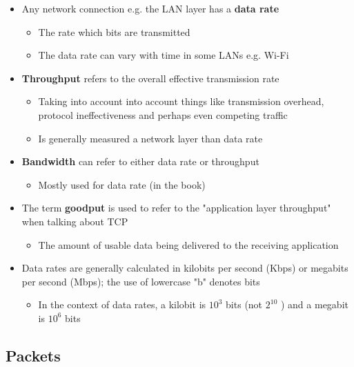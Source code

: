 \documentclass[11pt]{article}
\providecommand{\tightlist}{%
      \setlength{\itemsep}{0pt}\setlength{\parskip}{0pt}}
\begin{document}
\begin{itemize}
\tightlist
\item
  Any network connection e.g. the LAN layer has a \textbf{data rate}

  \begin{itemize}
  \tightlist
  \item
    The rate which bits are transmitted
  \item
    The data rate can vary with time in some LANs e.g. Wi-Fi
  \end{itemize}
\item
  \textbf{Throughput} refers to the overall effective transmission rate

  \begin{itemize}
  \tightlist
  \item
    Taking into account into account things like transmission overhead,
    protocol ineffectiveness and perhaps even competing traffic
  \item
    Is generally measured a network layer than data rate
  \end{itemize}
\item
  \textbf{Bandwidth} can refer to either data rate or throughput

  \begin{itemize}
  \tightlist
  \item
    Mostly used for data rate (in the book)
  \end{itemize}
\item
  The term \textbf{goodput} is used to refer to the "application layer
  throughput" when talking about TCP

  \begin{itemize}
  \tightlist
  \item
    The amount of usable data being delivered to the receiving
    application
  \end{itemize}
\item
  Data rates are generally calculated in kilobits per second (Kbps) or
  megabits per second (Mbps); the use of lowercase "b" denotes bits

  \begin{itemize}
  \tightlist
  \item
    In the context of data rates, a kilobit is \(10^3\) bits (not
    \(2^{10}\) ) and a megabit is \(10^6\) bits
  \end{itemize}
\end{itemize}

    \subsection{Packets}\label{packets}
\end{document}
